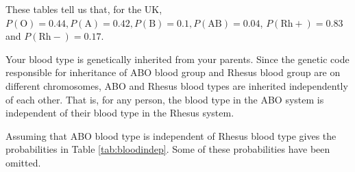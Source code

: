 \documentclass[
  british,
]{book}
\begin{document}
\FloatBarrier

These tables tell us that, for the UK, \(P(\mbox{O})=0.44, P(\mbox{A})=0.42, P(\mbox{B})=0.1, P(\mbox{AB})=0.04\), \(P(\mbox{Rh}+)=0.83\) and \(P(\mbox{Rh}-)=0.17\).

Your blood type is genetically inherited from your parents. Since the genetic code responsible for inheritance of ABO blood group and Rhesus blood group are on different chromosomes, ABO and Rhesus blood types are inherited independently of each other. That is, for any person, the blood type in the ABO system is independent of their blood type in the Rhesus system.

Assuming that ABO blood type is independent of Rhesus blood type gives the probabilities in Table \ref{tab:bloodindep}. Some of these probabilities have been omitted.

\FloatBarrier

 
  \providecommand{\huxb}[2]{\arrayrulecolor[RGB]{#1}\global\arrayrulewidth=#2pt}
  \providecommand{\huxvb}[2]{\color[RGB]{#1}\vrule width #2pt}
  \providecommand{\huxtpad}[1]{\rule{0pt}{#1}}
  \providecommand{\huxbpad}[1]{\rule[-#1]{0pt}{#1}}
\end{document}
